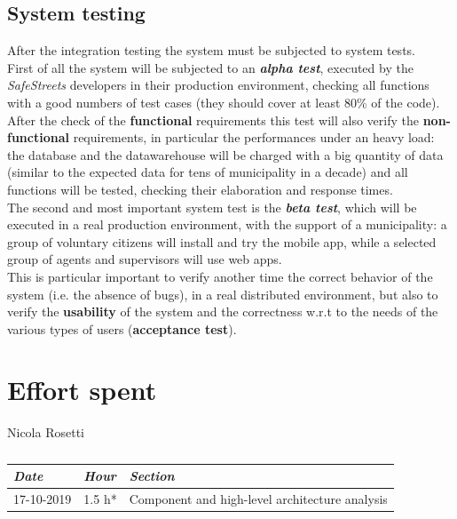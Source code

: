 \documentclass[a4paper]{report}
\begin{document}
\section{System testing}
After the integration testing the system must be subjected to system tests.\\
First of all the system will be subjected to an \textit{\textbf{alpha test}}, executed by the \textit{SafeStreets} developers in their production environment, checking all functions with a good numbers of test cases (they should cover at least 80\% of the code).\\
After the check of the \textbf{functional} requirements this test will also verify the \textbf{non-functional} requirements, in particular the performances under an heavy load: the database and the datawarehouse will be charged with a big quantity of data (similar to the expected data for tens of municipality in a decade) and all functions will be tested, checking their elaboration and response times.\\
The second and most important system test is the \textit{\textbf{beta test}}, which will be executed in a real production environment, with the support of a municipality: a group of voluntary citizens will install and try the mobile app, while a selected group of agents and supervisors will use web apps.\\
This is particular important to verify another time the correct behavior of the system (i.e. the absence of bugs), in a real distributed environment, but also to verify the \textbf{usability} of the system and the correctness w.r.t to the needs of the various types of users (\textbf{acceptance test}).


\chapter{Effort spent}

\begin{table}[H]
\centering
Nicola Rosetti \\
\begin{tabular}{p{2cm}p{1.5cm}p{7cm}}
\toprule
\textit{Date} & \textit{Hour} & \textit{Section} \\ \midrule
17-10-2019 & 1.5 h* & Component and high-level architecture analysis \\ \midrule
\bottomrule
\end{tabular}
\caption[Nicola Rosetti's effort table]{}
\end{table}
\end{document}
